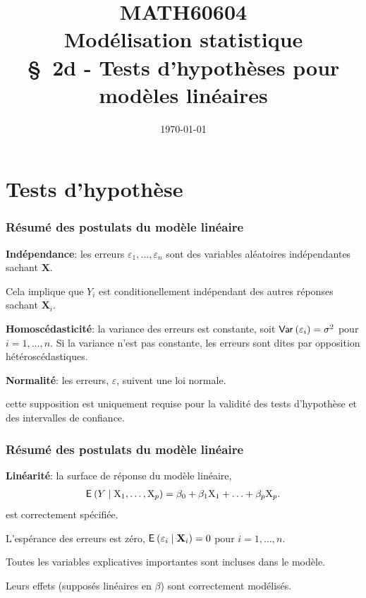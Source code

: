 \documentclass[xcolor={dvipsnames}]{beamer}
\title[\color{white}{MATH60604 \S~2d - Tests d'hypothèses pour modèles linéaires}]{MATH60604 \\Modélisation statistique \\ \S~2d - Tests d'hypothèses pour modèles linéaires}
\author{}
\date{\today}
\institute{HEC Montréal\\
Département de sciences de la décision}
\date{}
\begin{document}
\frame{\titlepage}



\section{Tests d'hypothèse}



\begin{frame}[fragile]
\frametitle{Résumé des postulats du modèle linéaire}
\be
\item \textbf{Indépendance}: les erreurs $\varepsilon_1, \ldots, \varepsilon_n$ sont des variables aléatoires \alert{indépendantes} sachant $\mathbf{X}$.
\bi
\item Cela implique que $Y_i$ est conditionellement indépendant des autres réponses sachant $\mathbf{X}_i$.
\ei
\item \textbf{Homoscédasticité}: la variance des erreurs est  \alert{constante}, soit  ${\mathsf{Var}_{}}\left(\varepsilon_i\right)=\sigma^2$  pour $i=1, \ldots, n$. Si la variance n'est pas constante, les erreurs sont dites par opposition hétéroscédastiques.
\item \textbf{Normalité}: les erreurs, $\varepsilon$, suivent une loi \alert{normale}.
\bi \item cette supposition est uniquement requise pour la validité des tests d'hypothèse et des intervalles de confiance.
\ei
\ee
\end{frame}

\begin{frame}[fragile]
\frametitle{Résumé des postulats du modèle linéaire}
\be
\setcounter{enumi}{3}
\item \textbf{Linéarité}: la surface de réponse du modèle linéaire,
\begin{align*}
{\mathsf E}_{}\left(Y \mid \mathrm{X}_1, \ldots, \mathrm{X}_p\right)=\beta_0+\beta_1\mathrm{X}_1+\ldots + \beta_p \mathrm{X}_p.
\end{align*}
est correctement spécifiée.
\bi \item L'espérance des erreurs est zéro, ${\mathsf E}_{}\left(\varepsilon_i \mid \mathbf{X}_i\right)=0$ pour $i=1,\ldots, n$.
\item Toutes les variables explicatives importantes sont incluses dans le modèle.
\item Leurs effets (supposés linéaires en $\beta$) sont correctement modélisés.
\ei
\ee
\end{frame}
\end{document}
